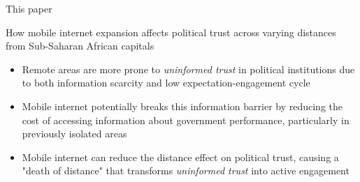 \documentclass[10pt]{beamer}
\begin{document}
\begin{frame}{This paper}
    \begin{center}
        How mobile internet expansion affects political trust across
        varying distances from Sub-Saharan African capitals  \pause
        \end{center}\vfill
    \begin{itemize}\setlength\itemsep{1em}
\item Remote areas are more prone to \textit{uninformed trust} in political institutions due to both information scarcity and low expectation-engagement cycle\vfill  \pause
\item Mobile internet potentially breaks this information barrier by reducing the cost of accessing
information about government performance, particularly in previously isolated areas\vfill  \pause
\item Mobile internet can reduce the distance effect on political trust, causing a "death of distance" that transforms \textit{uninformed trust} into active engagement\vfill
    \end{itemize}
\end{frame}
\end{document}
